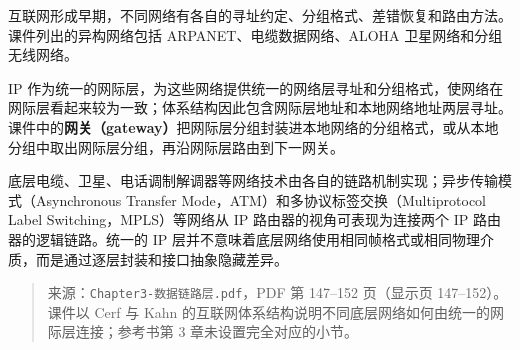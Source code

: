 互联网形成早期，不同网络有各自的寻址约定、分组格式、差错恢复和路由方法。课件列出的异构网络包括 ARPANET、电缆数据网络、ALOHA 卫星网络和分组无线网络。\par
IP 作为统一的网际层，为这些网络提供统一的网络层寻址和分组格式，使网络在网际层看起来较为一致；体系结构因此包含网际层地址和本地网络地址两层寻址。课件中的\textbf{网关（gateway）}把网际层分组封装进本地网络的分组格式，或从本地分组中取出网际层分组，再沿网际层路由到下一网关。

底层电缆、卫星、电话调制解调器等网络技术由各自的链路机制实现；异步传输模式（Asynchronous Transfer Mode，ATM）和多协议标签交换（Multiprotocol Label Switching，MPLS）等网络从 IP 路由器的视角可表现为连接两个 IP 路由器的逻辑链路。统一的 IP 层并不意味着底层网络使用相同帧格式或相同物理介质，而是通过逐层封装和接口抽象隐藏差异。

\begin{quote}\small 来源：\texttt{Chapter3-数据链路层.pdf}，PDF 第 147--152 页（显示页 147--152）。课件以 Cerf 与 Kahn 的互联网体系结构说明不同底层网络如何由统一的网际层连接；参考书第 3 章未设置完全对应的小节。\end{quote}
